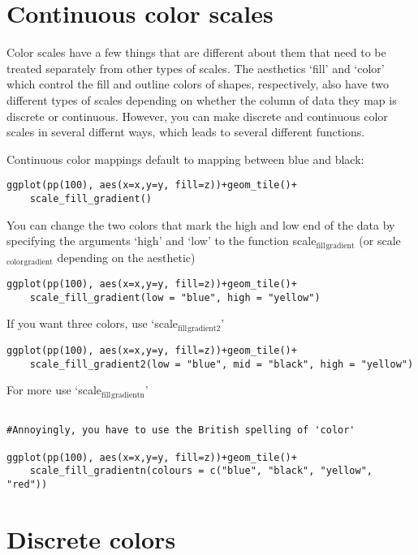 \documentclass[11pt]{article}
\begin{document}
\section{Continuous color scales}
\label{sec-4}


Color scales have a few things that are different about them that need
to be treated separately from other types of scales. The aesthetics
`fill' and `color' which control the fill and outline colors of
shapes, respectively, also have two different types of scales
depending on whether the column of data they map is discrete or
continuous. However, you can make discrete and continuous color scales
in several differnt ways, which leads to several different functions.

Continuous color mappings default to mapping between blue and black:

\begin{verbatim}
ggplot(pp(100), aes(x=x,y=y, fill=z))+geom_tile()+
    scale_fill_gradient()
\end{verbatim}


You can change the two colors that mark the high and low end of the
data by specifying the arguments `high' and `low' to the function
scale$_{\mathrm{fill}}$$_{\mathrm{gradient}}$ (or scale$_{\mathrm{color}}$$_{\mathrm{gradient}}$ depending on the aesthetic)

\begin{verbatim}
ggplot(pp(100), aes(x=x,y=y, fill=z))+geom_tile()+
    scale_fill_gradient(low = "blue", high = "yellow")
\end{verbatim}


If you want three colors, use `scale$_{\mathrm{fill}}$$_{\mathrm{gradient2}}$'

\begin{verbatim}
ggplot(pp(100), aes(x=x,y=y, fill=z))+geom_tile()+
    scale_fill_gradient2(low = "blue", mid = "black", high = "yellow")
\end{verbatim}


For more use `scale$_{\mathrm{fill}}$$_{\mathrm{gradientn}}$'

\begin{verbatim}

#Annoyingly, you have to use the British spelling of 'color'

ggplot(pp(100), aes(x=x,y=y, fill=z))+geom_tile()+
    scale_fill_gradientn(colours = c("blue", "black", "yellow", "red"))
\end{verbatim}
\section{Discrete colors}
\label{sec-5}
\end{document}
